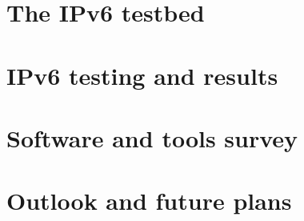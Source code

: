 \documentclass[a4paper]{jpconf}
\begin{document}
\section{The IPv6 testbed}


\section{IPv6 testing and results}


\section{Software and tools survey}


%

\section{Outlook and future plans}


\par

\end{document}
